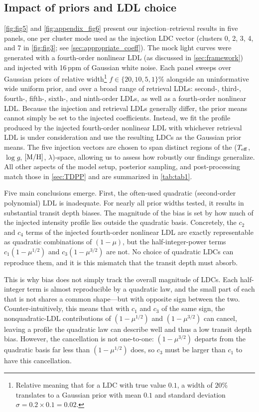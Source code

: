 \documentclass[twocolumn]{aastex631}
\newcommand{\vtwo}[1]{{#1}}
\begin{document}
\subsection{Impact of priors and LDL choice}\label{sec:impact_prior_choice}

\autoref{fig:fig5} \vtwo{and \autoref{fig:appendix_fig6} present our injection--retrieval results in five panels, one per cluster mode used as the injection LDC vector (clusters 0, 2, 3, 4, and 7} in \autoref{fig:fig3}; see \autoref{sec:appropriate_coeff}). The mock light curves were generated with a fourth-order nonlinear LDL (as discussed in \autoref{sec:framework}) and injected with 16\,ppm of Gaussian white noise. Each panel sweeps over Gaussian priors of relative width\footnote{Relative meaning that for a LDC with true value $0.1$, a width of $20\%$ translates to a Gaussian prior with mean $0.1$ and standard deviation $\sigma = 0.2\times0.1=0.02$.} $f \in \{20, 10, 5, 1\}\%$ alongside an uninformative wide uniform prior, and over a broad range of retrieval LDLs: second-, third-, fourth-, fifth-, sixth-, and ninth-order LDLs, as well as \vtwo{a} fourth-order nonlinear LDL. Because the injection and retrieval LDLs generally differ, the prior means cannot simply be set to the injected coefficients. Instead, we fit the profile produced by the injected fourth-order nonlinear LDL with whichever retrieval LDL is under consideration and use the resulting LDCs as the Gaussian prior means. The \vtwo{five} injection vectors are chosen to span distinct regions of the  ($T_{\rm eff}$, $\log g$, $[\rm M/H]$, $\lambda$)-space, allowing us to assess how robustly our findings generalize. All other aspects of the model setup, posterior sampling, and post-processing match \vtwo{those in} \autoref{sec:TDPP} and are summarized in \autoref{tab:tab1}. 

Five main conclusions emerge.
\vtwo{First, the often-used quadratic (second-order polynomial) LDL is inadequate. For nearly all prior widths tested, it results in substantial transit depth biases. The magnitude of the bias is set by how much of the injected intensity profile lies outside the quadratic basis. Concretely, the $c_2$ and $c_4$ terms of the injected fourth-order nonlinear LDL are exactly representable as quadratic combinations of $(1-\mu)$, but the half-integer-power terms $c_1(1-\mu^{1/2})$ and $c_3(1-\mu^{3/2})$ are not. No choice of quadratic LDCs can reproduce them, and it is this mismatch that the transit depth must absorb.}

\vtwo{This is why bias does not simply track the overall magnitude of LDCs. Each half-integer term is almost reproducible by a quadratic law, and the small part of each that is not shares a common shape---but with opposite sign between the two. Counter-intuitively, this means that with $c_1$ and $c_3$ of the same sign, the nonquadratic-LDL contributions of $(1-\mu^{1/2})$ and $(1-\mu^{3/2})$ can cancel, leaving a profile the quadratic law can describe well and thus a low transit depth bias. However, the cancellation is not one-to-one: $(1-\mu^{3/2})$ departs from the quadratic basis far less than $(1-\mu^{1/2})$ does, so $c_3$ must be larger than $c_1$ to have this cancellation.}
\end{document}
